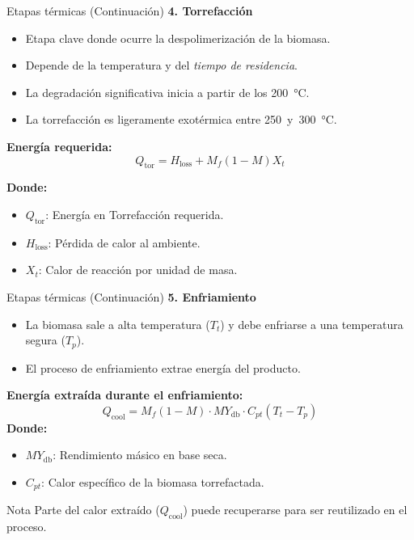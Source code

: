 \documentclass[main.tex]{subfiles}
\begin{document}
\begin{frame}{Etapas térmicas (Continuación)}
\footnotesize
  \textbf{4. Torrefacción}
  \begin{itemize}
    \item Etapa clave donde ocurre la despolimerización de la biomasa.
    \item Depende de la temperatura y del \textit{tiempo de residencia}.
    \item La degradación significativa inicia a partir de los \SI{200}{\celsius}.
    \item La torrefacción es ligeramente exotérmica entre \SI{250} y \SI{300}{\celsius}.
  \end{itemize}
  \textbf{Energía requerida:}
  \[
  Q_{\text{tor}} = H_{\text{loss}} + M_f (1 - M) X_t
  \]

  \textbf{Donde:}
  \begin{itemize}
    \item $Q_{\text{tor}}$: Energía en Torrefacción requerida.
    \item $H_{\text{loss}}$: Pérdida de calor al ambiente.
    \item $X_t$: Calor de reacción por unidad de masa.
  \end{itemize}
\end{frame}

\begin{frame}{Etapas térmicas (Continuación)}
\footnotesize
  \textbf{5. Enfriamiento}
  \begin{itemize}
    \item La biomasa sale a alta temperatura ($T_t$) y debe enfriarse a una temperatura segura ($T_p$).
    \item El proceso de enfriamiento extrae energía del producto.
  \end{itemize}
  \textbf{Energía extraída durante el enfriamiento:}
  \[
  Q_{\text{cool}} = M_f (1 - M) \cdot MY_{\text{db}} \cdot C_{pt} (T_t - T_p)
  \]
  \textbf{Donde:}
  \begin{itemize}
    \item $MY_{\text{db}}$: Rendimiento másico en base seca.
    \item $C_{pt}$: Calor específico de la biomasa torrefactada.
  \end{itemize}
  \begin{alertblock}{Nota}
  Parte del calor extraído ($Q_{\text{cool}}$) puede recuperarse para ser reutilizado en el proceso.
  \end{alertblock}
\end{frame}
\end{document}
